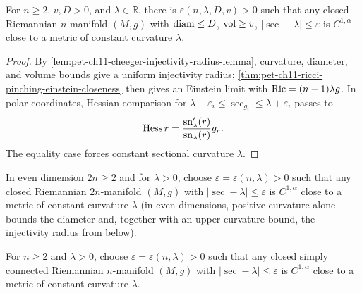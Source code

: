 \begin{theorem}
  \label{thm:pet-ch11-sec-pinching-constant-curvature-closeness}

  For $n\ge2$, $v,D>0$, and $\lambda\in\mathbb{R}$, there is
  $\varepsilon(n,\lambda,D,v)>0$ such that any closed Riemannian $n$-manifold
  $(M,g)$ with $\operatorname{diam}\le D$, $\operatorname{vol}\ge v$, $|\sec-\lambda|\le\varepsilon$ is
  $C^{1,\alpha}$ close to a metric of constant curvature $\lambda$.
\end{theorem}
\begin{proof}
  \sketch
  By \cref{lem:pet-ch11-cheeger-injectivity-radius-lemma}, curvature, diameter, and volume bounds give a uniform injectivity radius; \cref{thm:pet-ch11-ricci-pinching-einstein-closeness} then gives an Einstein limit with \(\operatorname{Ric}=(n-1)\lambda g\). In polar coordinates, Hessian comparison for \(\lambda-\varepsilon_i\le\sec_{g_i}\le\lambda+\varepsilon_i\) passes to
  \[
    \operatorname{Hess} r=\frac{\mathrm{sn}_{\lambda}^{\prime}(r)}{\mathrm{sn}_{\lambda}(r)}g_r.
  \]
  The equality case forces constant sectional curvature \(\lambda\).
\end{proof}


\begin{corollary}
  \label{cor:pet-ch11-even-dim-positive-pinching}

  In even dimension $2n\ge2$ and for $\lambda>0$, choose
  $\varepsilon=\varepsilon(n,\lambda)>0$
  such that any closed Riemannian $2n$-manifold $(M,g)$ with
  $|\sec-\lambda|\le\varepsilon$ is $C^{1,\alpha}$ close to a metric of
  constant curvature $\lambda$ (in even dimensions, positive curvature alone
  bounds the diameter and, together with an upper curvature bound, the
  injectivity radius from below).
\end{corollary}

\begin{corollary}
  \label{cor:pet-ch11-odd-dim-simply-connected-pinching}

  For $n\ge2$ and $\lambda>0$, choose $\varepsilon=\varepsilon(n,\lambda)>0$
  such that any closed simply connected Riemannian $n$-manifold $(M,g)$ with
  $|\sec-\lambda|\le\varepsilon$ is $C^{1,\alpha}$ close to a metric of
  constant curvature $\lambda$.
\end{corollary}

